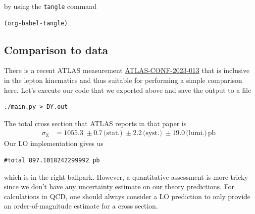 \documentclass[11pt]{article}
\begin{document}
by using the \texttt{tangle} command
\begin{verbatim}
(org-babel-tangle)
\end{verbatim}
\subsection{Comparison to data}
\label{sec:org0a66ae0}
There is a recent ATLAS measurement \href{https://atlas.web.cern.ch/Atlas/GROUPS/PHYSICS/CONFNOTES/ATLAS-CONF-2023-013/}{ATLAS-CONF-2023-013} that is inclusive in the lepton kinematics and thus suitable for performing a simple comparison here.
Let's execute our code that we exported above and save the output to a file
\begin{verbatim}
./main.py > DY.out
\end{verbatim}
The total cross section that ATLAS reports in that paper is
\begin{align}
  \sigma_\mathrm{Z}
  &=
  1055.3 \;\pm 0.7 \,\text{(stat.)} \;\pm 2.2 \,\text{(syst.)} \;\pm 19.0 \,\text{(lumi.)} \,\mathrm{pb}
\end{align}
Our LO implementation gives us
\label{}
\begin{verbatim}
#total 897.1018242299992 pb
\end{verbatim}

which is in the right ballpark.
However, a quantitative assessment is more tricky since we don't have any uncertainty estimate on our theory predictions.
For calculations in QCD, one should always consider a LO prediction to only provide an order-of-magnitude estimate for a cross section.
\end{document}
